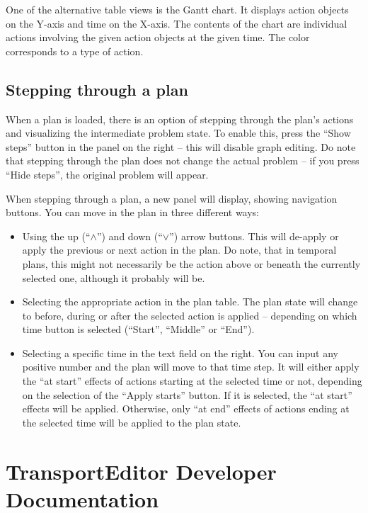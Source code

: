 One of the alternative table views is the Gantt chart. It displays action objects on the Y-axis and time on the X-axis.
The contents of the chart are individual actions involving the given action objects at the given time. The color
corresponds to a type of action.

\subsection*{Stepping through a plan}
When a plan is loaded, there is an option of stepping through the plan's actions and visualizing the intermediate
problem state. To enable this, press the ``Show steps'' button in the panel on the right -- this will disable graph editing.
Do note that stepping through the plan does not change the
actual problem -- if you press ``Hide steps'', the original problem will appear.

When stepping through a plan, a new panel will display, showing navigation buttons.
You can move in the plan in three different ways:

\begin{itemize}

\item Using the up (``$\wedge$'') and down (``$\vee$'') arrow buttons. This will de-apply or apply the previous
or next action in the plan. Do note, that in temporal plans, this might not necessarily be the action
above or beneath the currently selected one, although it probably will be.

\item Selecting the appropriate action in the plan table. The plan state will change to before, during or after the
selected action is applied -- depending on which time button is selected (``Start'', ``Middle'' or ``End'').

\item Selecting a specific time in the text field on the right. You can input any positive number and the plan will move to
that time step. It will either apply the ``at start'' effects of actions starting at the selected time or not, depending
on the selection of the ``Apply starts'' button. If it is selected, the ``at start'' effects will be applied.
Otherwise, only ``at end'' effects of actions ending at the selected time will be applied to the plan state.

\end{itemize}

\newpage

\section*{TransportEditor Developer Documentation}\label{transporteditor-developer-documentation}

